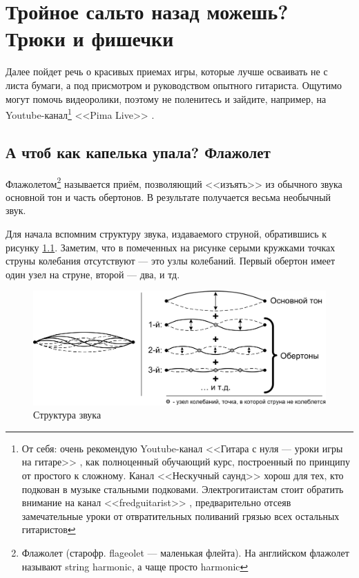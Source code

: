 \chapter{Тройное сальто назад можешь? Трюки и фишечки}
\label{ch:tricks}

Далее пойдет речь о красивых приемах игры, которые лучше осваивать не с листа бумаги, а под присмотром и руководством опытного гитариста. Ощутимо могут помочь видеоролики, поэтому не поленитесь и зайдите, например, на Youtube-канал\footnote{От себя: очень рекомендую Youtube-канал <<Гитара с нуля --- уроки игры на гитаре>> \cite{url:guitarFromZero}, как полноценный обучающий курс, построенный по принципу от простого к сложному. Канал <<Нескучный саунд>> \cite{url:funnySound} хорош для тех, кто подкован в музыке стальными подковами. Электрогитаистам стоит обратить внимание на канал <<fredguitarist>> \cite{url:fredguitarist}, предварительно отсеяв замечательные уроки от отвратительных поливаний грязью всех остальных гитаристов} <<Pima Live>> \cite{url:pimalive}.


\section{А чтоб как капелька упала? Флажолет}
\label{ch:tricks:flageolet}

Флажолетом\footnote{Флажолет (старофр. flageolet --- маленькая флейта). На английском флажолет называют string harmonic, а чаще просто harmonic} называется приём, позволяющий <<изъять>> из обычного звука основной тон и часть обертонов. В результате получается весьма необычный звук.

Для начала вспомним структуру звука, издаваемого струной, обратившись к рисунку \ref{fig:tricks:flageolet:nodes}. Заметим, что в помеченных на рисунке серыми кружками точках струны колебания отсутствуют --- это узлы колебаний. Первый обертон имеет один узел на струне, второй --- два, и тд.

\begin{figure}[!ht]
    \centering
    \includegraphics{fig/string-nodes} 
    \caption{Структура звука}\label{fig:tricks:flageolet:nodes}
\end{figure}

